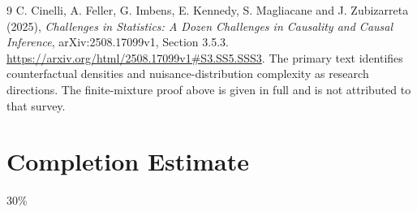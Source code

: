 \documentclass[11pt,a4paper]{article}
\theoremstyle{remark}
\begin{document}
\begin{thebibliography}{9}
 C. Cinelli, A. Feller, G. Imbens, E. Kennedy, S. Magliacane and J. Zubizarreta (2025), \emph{Challenges in Statistics: A Dozen Challenges in Causality and Causal Inference}, arXiv:2508.17099v1, Section 3.5.3. \url{https://arxiv.org/html/2508.17099v1#S3.SS5.SSS3}. The primary text identifies counterfactual densities and nuisance-distribution complexity as research directions. The finite-mixture proof above is given in full and is not attributed to that survey.
\end{thebibliography}

\section{Completion Estimate}
30\%
\end{document}
